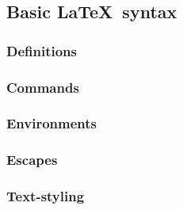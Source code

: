 \subsection{Basic \LaTeX\ syntax}
\subsubsection*{Definitions}
\subsubsection*{Commands}
\subsubsection*{Environments}
\subsubsection*{Escapes}
\subsubsection*{Text-styling}
